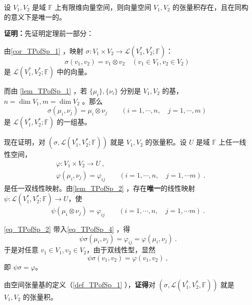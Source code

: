 \begin{theorem}{}\label{the_TPofSp_1}
设 $V_1,V_2$ 是域 $\mathbb F$ 上有限维向量空间，则向量空间 $V_1,V_2$ 的张量积存在，且在同构的意义下是唯一的。
\end{theorem}
\textbf{证明：}先证明定理前一部分：

由\autoref{cor_TPofSp_1} ，映射 $\sigma:V_1\times V_2\rightarrow\mathcal L(V^*_1,V^*_2;\mathbb F) $：
\begin{equation}\label{eq_TPofSp_7}
\sigma(v_1,v_2)=v_1\otimes v_2 \quad (v_1\in V_1,v_2\in V_2 )~
\end{equation}
是  $\mathcal L(V^*_1,V^*_2;\mathbb F)$ 中的向量。

而由 \autoref{lem_TPofSp_1} ，若 $\{\mu_i\},\{\nu_i\}$ 分别是 $V_1,V_2$ 的基，$n=\dim V_1,m=\dim V_2$ 。那么
\begin{equation}\label{eq_TPofSp_2}
\sigma(\mu_i,\nu_j)=\mu_i\otimes \nu_j\qquad (i=1,\cdots,n,\quad j=1,\cdots,m)~
\end{equation}
是 $\mathcal L(V^*_1,V^*_2;\mathbb F)$ 的一组基。

现在证明，对 $(\sigma,\mathcal L(V^*_1,V^*_2;\mathbb F))$ 就是 $V_1,V_2$ 的张量积。设 $U$ 是域 $\mathbb F$ 上任一线性空间，
\begin{equation}\label{eq_TPofSp_3}
\begin{aligned}
&\varphi:V_1\times V_2\rightarrow U~,\\
&\varphi(\mu_i,\nu_j)=\varphi_{ij}\qquad (i=1,\cdots,n,\quad j=1,\cdots m)~.
\end{aligned}
\end{equation}
是任一双线性映射。由\autoref{lem_TPofSp_2} ，存在\textbf{唯一}的线性映射 $\psi:\mathcal L(V^*_1,V^*_2;\mathbb F)\rightarrow U$，使
\begin{equation}\label{eq_TPofSp_4}
\psi(\mu_i\otimes \nu_j)=\varphi_{ij}\qquad( i=1,\cdots,n,\quad j=1,\cdots m)~.
\end{equation}

\autoref{eq_TPofSp_2} 带入\autoref{eq_TPofSp_4}  ，得
\begin{equation}
\psi\sigma(\mu_i,\nu_j)=\varphi_{ij}=\varphi(\mu_i,\nu_j)~.
\end{equation}
于是对任意 $v_1\in V_1,v_2\in V_2$，由于双线性型，显然
\begin{equation}
\psi\sigma(v_1,v_2)=\varphi(v_1,v_2)~,
\end{equation}
即 $\psi\sigma=\varphi$。

由空间张量基的定义（\autoref{def_TPofSp_1} ），\textbf{证得}对 $(\sigma,\mathcal L(V^*_1,V^*_2,\mathbb F))$ 就是 $V_1,V_2$ 的张量积。

